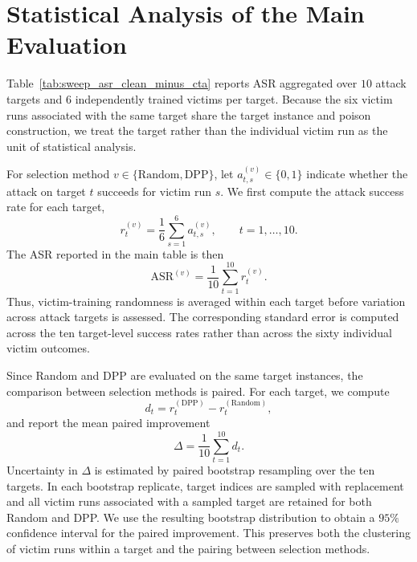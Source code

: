 
\section{Statistical Analysis of the Main Evaluation}
\label{app:statistical-analysis}

Table~\ref{tab:sweep_asr_clean_minus_cta} reports ASR aggregated over
$10$ attack targets and $6$ independently trained victims per target.
Because the six victim runs associated with the same target share the
target instance and poison construction, we treat the target rather than
the individual victim run as the unit of statistical analysis.

For selection method $v\in\{\mathrm{Random},\mathrm{DPP}\}$, let
$a^{(v)}_{t,s}\in\{0,1\}$ indicate whether the attack on target $t$
succeeds for victim run $s$. We first compute the attack success rate
for each target,
\begin{equation}
    r^{(v)}_t
    =
    \frac{1}{6}
    \sum_{s=1}^{6}
    a^{(v)}_{t,s},
    \qquad t=1,\ldots,10.
\end{equation}
The ASR reported in the main table is then
\begin{equation}
    \mathrm{ASR}^{(v)}
    =
    \frac{1}{10}
    \sum_{t=1}^{10}
    r^{(v)}_t.
\end{equation}
Thus, victim-training randomness is averaged within each target before
variation across attack targets is assessed. The corresponding standard
error is computed across the ten target-level success rates rather than
across the sixty individual victim outcomes.

Since Random and DPP are evaluated on the same target instances, the
comparison between selection methods is paired. For each target, we
compute
\begin{equation}
    d_t
    =
    r^{(\mathrm{DPP})}_t
    -
    r^{(\mathrm{Random})}_t,
\end{equation}
and report the mean paired improvement
\begin{equation}
    \Delta
    =
    \frac{1}{10}
    \sum_{t=1}^{10} d_t.
\end{equation}
Uncertainty in $\Delta$ is estimated by paired bootstrap resampling over
the ten targets. In each bootstrap replicate, target indices are sampled
with replacement and all victim runs associated with a sampled target
are retained for both Random and DPP. We use the resulting bootstrap
distribution to obtain a $95\%$ confidence interval for the paired
improvement. This preserves both the clustering of victim runs within a
target and the pairing between selection methods.

